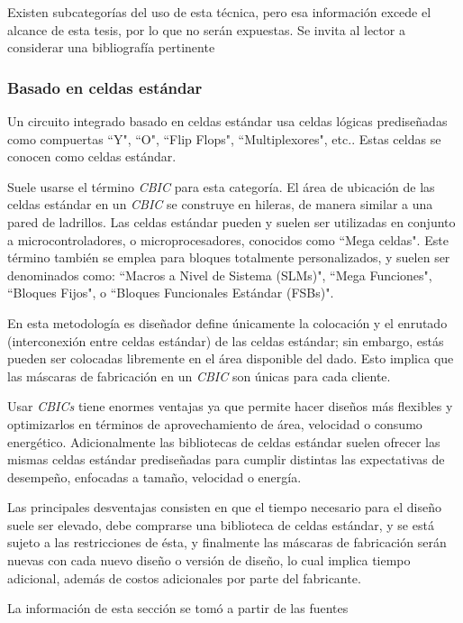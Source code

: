 Existen subcategorías del uso de esta técnica, pero esa información excede el alcance de esta tesis, por lo que no serán expuestas. Se invita al lector a considerar una bibliografía pertinente \cite{book:johnM1997,book:barrK2006}

\subsubsection{Basado en celdas estándar}

Un circuito integrado basado en celdas estándar usa celdas lógicas prediseñadas como compuertas ``Y", ``O", ``Flip Flops", ``Multiplexores", etc.. Estas celdas se conocen como celdas estándar.

Suele usarse el término \textit{CBIC} para esta categoría. El área de ubicación de las celdas estándar en un \textit{CBIC} se construye en hileras, de manera similar a una pared de ladrillos. Las celdas estándar pueden y suelen ser utilizadas en conjunto a microcontroladores, o microprocesadores, conocidos como ``Mega celdas". Este término también se emplea para bloques totalmente personalizados, y suelen ser denominados como: ``Macros a Nivel de Sistema (SLMs)", ``Mega Funciones", ``Bloques Fijos", o ``Bloques Funcionales Estándar (FSBs)".

En esta metodología es diseñador define únicamente la colocación y el enrutado (interconexión entre celdas estándar) de las celdas estándar; sin embargo, estás pueden ser colocadas libremente en el área disponible del dado. Esto implica que las máscaras de fabricación en un \textit{CBIC} son únicas para cada cliente.

Usar \textit{CBICs} tiene enormes ventajas ya que permite hacer diseños más flexibles y optimizarlos en términos de aprovechamiento de área, velocidad o consumo energético. Adicionalmente las bibliotecas de celdas estándar suelen ofrecer las mismas celdas estándar prediseñadas para cumplir distintas las expectativas de desempeño, enfocadas a tamaño, velocidad o energía.

Las principales desventajas consisten en que el tiempo necesario para el diseño suele ser elevado, debe comprarse una biblioteca de celdas estándar, y se está sujeto a las restricciones de ésta, y finalmente las máscaras de fabricación serán nuevas con cada nuevo diseño o versión de diseño, lo cual implica tiempo adicional, además de costos adicionales por parte del fabricante.

La información de esta sección se tomó a partir de las fuentes \cite{book:raj2008,book:johnM1997,book:raj2008}

